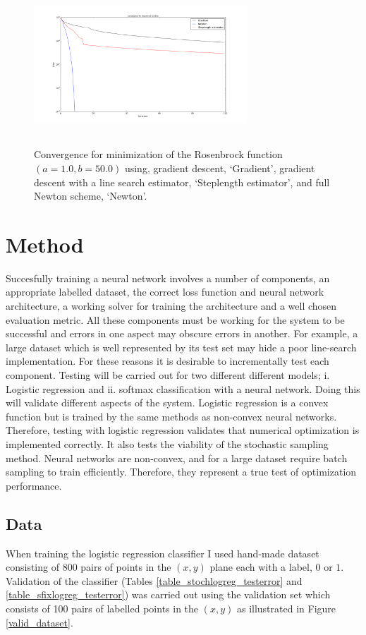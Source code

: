 \documentclass[nohyperref]{article}
\theoremstyle{plain}
\theoremstyle{definition}
\theoremstyle{remark}
\begin{document}
\begin{figure}[!ht]
\centering
\includegraphics[height=6cm, width=8cm]{../src-rosen/Rosenbrock_convergence.png}
\caption{Convergence for minimization of the Rosenbrock function $(a=1.0, b=50.0)$ using, gradient descent, `Gradient', gradient descent with a line search estimator, `Steplength estimator', and full Newton scheme, `Newton'.}\label{Rosenbrock_conv1}
\end{figure}

\section{Method}
Succesfully training a neural network involves a number of components, an appropriate labelled dataset, the correct loss function and neural network architecture, a working solver for training the architecture and a well chosen evaluation metric.  All these components must be working for the system to be successful and errors in one aspect may obscure errors in another. For example, a large dataset which is well represented by its test set may hide a poor line-search implementation. For these reasons it is desirable to incrementally test each component. Testing will be carried out for two different different models; i. Logistic regression and ii. softmax classification with a neural network. Doing this will validate different aspects of the system. Logistic regression is a convex function but is trained by the same methods as non-convex neural networks. Therefore, testing with logistic regression validates that numerical optimization is implemented correctly. It also tests the viability of the stochastic sampling method. Neural networks are non-convex, and for a large dataset require batch sampling to train efficiently. Therefore, they represent a true test of optimization performance. 

\subsection{Data} 
When training the logistic regression classifier I used hand-made dataset consisting of 800 pairs of points in the $(x,y)$ plane each with a label, $0$ or $1$. Validation of the classifier (Tables \ref{table_stochlogreg_testerror} and \ref{table_sfixlogreg_testerror}) was carried out using the validation set which consists of 100 pairs of labelled points in the $(x,y)$ as illustrated in Figure \ref{valid_dataset}.
\end{document}

